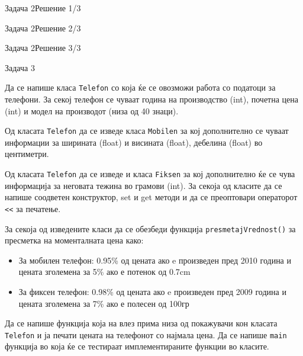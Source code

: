 \begin{frame}[fragile]{Задача 2}{Решение 1/3}

\end{frame}

\begin{frame}[fragile]{Задача 2}{Решение 2/3}

\end{frame}

\begin{frame}[fragile]{Задача 2}{Решение 3/3}

\end{frame}

\begin{frame}{Задача 3}
\begin{scriptsize}
    Да се напише класа \texttt{Telefon} со која ќе се овозможи работа со податоци за
    телефони. За секој телефон се чуваат година на производство (int), почетна
    цена (int) и модел на производот (низа од 40 знаци). 
    
    Од класата \texttt{Telefon} да се изведе класа \texttt{Mobilen} за кој дополнително се чуваат
    информации за ширината (float) и висината (float), дебелина (float) во центиметри. 
    
    Од класата \texttt{Telefon} да се изведе и класа \texttt{Fiksen} за кој дополнително ќе се
    чува информација за неговата тежина во грамови (int). За секоја од класите да се
    напише соодветен конструктор, set и get методи и да се преоптовари
    операторот \texttt{<<} за печатење. 
    
    За секоја од изведените класи да се обезбеди функција \texttt{presmetajVrednost()} за
    пресметка на моменталната цена како: 
    \begin{itemize}
      \item За мобилен телефон: 0.95\% од цената ако e произведен пред 2010
      година и цената зголемена за 5\% ако е потенок од 0.7cm
     \item За фиксен телефон: 0.98\% од цената ако e произведен пред 2009
     година и цената зголемена за 7\% ако е полесен од 100гр
    \end{itemize}
     
    Да се напише функција која на влез прима низа од покажувачи кон класата
    \texttt{Telefon} и ја печати цената на телефонот со најмала цена. Да се напише \texttt{main}
    функција во која ќе се тестираат имплементираните функции во класите.
\end{scriptsize}
\end{frame}

